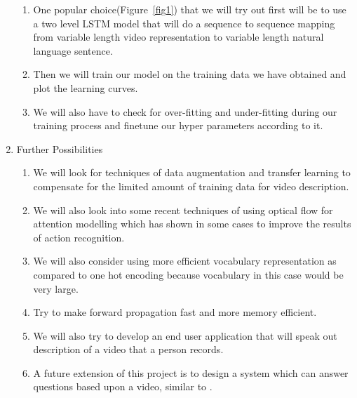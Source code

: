 \documentclass[11pt]{article}
\begin{document}
\begin{enumerate}
\begin{enumerate}
				\item
					One popular choice\cite{s2vt}(Figure~\ref{fig1}) that we will try out first will be to use a two level LSTM model that will do a sequence to sequence mapping from variable length video representation to variable length natural language sentence.
				\item
					Then we will train our model on the training data we have obtained and plot the learning curves.
				\item
					We will also have to check for over-fitting and under-fitting during our training process and finetune our hyper parameters according to it.
			\end{enumerate}
			\item Further Possibilities
			\begin{enumerate}
				\item We will look for techniques of data augmentation and transfer learning\cite{proposal} to compensate for the limited amount of training data for video description.
				\item We will also look into some recent techniques of using optical flow for attention modelling\cite{s2vt} which has shown in some cases to improve the results of action recognition.
				\item We will also consider using more efficient vocabulary representation as compared to one hot encoding because vocabulary in this case would be very large.
				\item Try to make forward propagation fast and more memory efficient.
				\item We will also try to develop an end user application that will speak out description of a video that a person records.
				\item A future extension of this project is to design a system which can answer questions based upon a video, similar to \cite{visualqa}.
			\end{enumerate}
		\end{enumerate}

	
\end{document}
